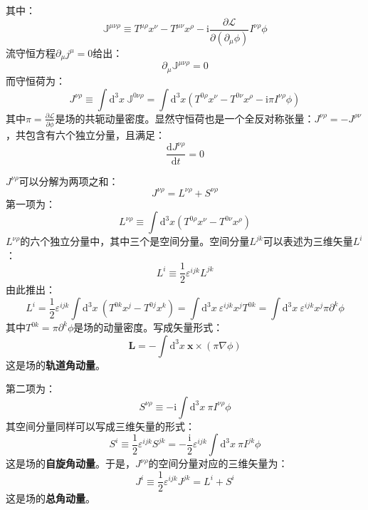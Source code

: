 \documentclass{book}
\begin{document}
其中：
\begin{equation}
	\mathbb{J}^{\mu\nu\rho}\equiv T^{\mu\rho}x^{\nu}-T^{\mu\nu}x^{\rho}-\mathrm{i}\frac{\partial\mathscr{L}}{\partial(\partial_{\mu}\phi)}I^{\nu\rho}\phi
\end{equation}
流守恒方程$\partial_\mu j^\mu=0$给出：
\begin{equation}
	\partial_\mu\mathbb{J}^{\mu\nu\rho}=0
\end{equation}
而守恒荷为：
\begin{equation}
	J^{\nu\rho}\equiv\int\mathrm{d}^3x\ \mathbb{J}^{0\nu\rho}=\int\mathrm{d}^3x\left(T^{0\rho}x^\nu-T^{0\nu}x^\rho-\mathrm{i}\pi I^{\nu\rho}\phi\right)
\end{equation}
其中$\pi=\frac{\partial\mathscr{L}}{\partial\dot{\phi}}$是场的共轭动量密度。显然守恒荷也是一个全反对称张量：$J^{\nu\rho}=-J^{\rho\nu}$，共包含有六个独立分量，且满足：
\begin{equation}
	\frac{\mathrm{d}J^{\nu\rho}}{\mathrm{d}t}=0
\end{equation}

$J^{\nu\rho}$可以分解为两项之和：
\begin{equation}
	J^{\nu\rho}=L^{\nu\rho}+S^{\nu\rho}
\end{equation}
第一项为：
\begin{equation}
	L^{\nu\rho}\equiv\int\mathrm{d}^3x\left(T^{0\rho}x^\nu-T^{0\nu}x^\rho\right)
\end{equation}
$L^{\nu\rho}$的六个独立分量中，其中三个是空间分量。空间分量$L^{jk}$可以表述为三维矢量$L^i$：
\begin{equation}
	L^i\equiv\frac12\varepsilon^{ijk}L^{jk}
\end{equation}
由此推出：
\begin{equation}
	L^{i}=\frac{1}{2}\varepsilon^{ijk}\int\mathrm{d}^{3}x\ (T^{0k}x^{j}-T^{0j}x^{k})=\int\mathrm{d}^{3}x\ \varepsilon^{ijk}x^{j}T^{0k}=\int\mathrm{d}^{3}x\ \varepsilon^{ijk}x^{j}\pi\partial^{k}\phi
\end{equation}
其中$T^{0k}=\pi\partial^k\phi$是场的动量密度。写成矢量形式：
\begin{equation}
	\mathbf{L}=-\int\mathrm{d}^3x\ \mathbf{x}\times(\pi\nabla\phi)
\end{equation}
这是场的\textbf{轨道角动量}。

第二项为：
\begin{equation}
	S^{\nu\rho}\equiv-\mathrm{i}\int\mathrm{d}^3x\ \pi I^{\nu\rho}\phi
\end{equation}
其空间分量同样可以写成三维矢量的形式：
\begin{equation}
	S^i\equiv\frac{1}{2}\varepsilon^{ijk}S^{jk}=-\frac{\mathrm{i}}{2}\varepsilon^{ijk}\int\mathrm{d}^{3}x\ \pi I^{jk}\phi
\end{equation}
这是场的\textbf{自旋角动量}。于是，$J^{\nu\rho}$的空间分量对应的三维矢量为：
\begin{equation}
	J^i\equiv\frac{1}{2}\varepsilon^{ijk}J^{jk}=L^i+S^i
\end{equation}
这是场的\textbf{总角动量}。
\end{document}
